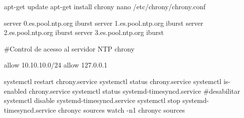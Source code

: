 apt-get update
apt-get install chrony
nano /etc/chrony/chrony.conf 


server 0.es.pool.ntp.org iburst
server 1.es.pool.ntp.org iburst
server 2.es.pool.ntp.org iburst
server 3.es.pool.ntp.org iburst

#Control de acesso al servidor NTP chrony

allow 10.10.10.0/24
allow 127.0.0.1





systemctl restart chrony.service
systemctl status chrony.service
systemctl is-enabled chrony.service
systemctl status systemd-timesyncd.service
#desabilitar 
systemctl disable systemd-timesyncd.service
systemctl stop systemd-timesyncd.service
chronyc sources
watch -n1 chronyc sources